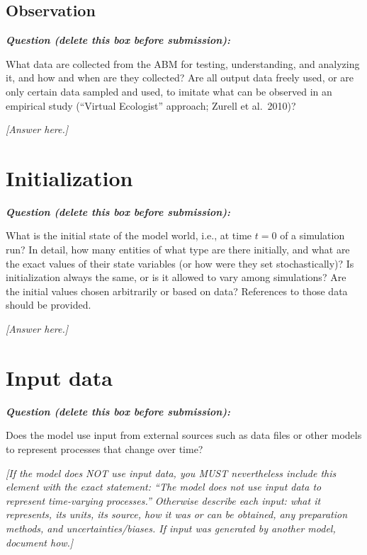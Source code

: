 \documentclass[11pt,a4paper]{article}
\newenvironment{question}
  {\begin{oddquestion}\small\itshape\color{oddquestioncolor}%
   \textbf{Question (delete this box before submission):}\par\smallskip}
  {\end{oddquestion}}
\begin{document}
\subsection{Observation}
\begin{question}
What data are collected from the ABM for testing, understanding, and
analyzing it, and how and when are they collected? Are all output data
freely used, or are only certain data sampled and used, to imitate what
can be observed in an empirical study (``Virtual Ecologist'' approach;
Zurell et al.\ 2010)?
\end{question}
\textit{[Answer here.]}


\section{Initialization}
\begin{question}
What is the initial state of the model world, i.e., at time $t = 0$ of
a simulation run? In detail, how many entities of what type are there
initially, and what are the exact values of their state variables (or
how were they set stochastically)? Is initialization always the same, or
is it allowed to vary among simulations? Are the initial values chosen
arbitrarily or based on data? References to those data should be
provided.
\end{question}
\textit{[Answer here.]}%


\section{Input data}
\begin{question}
Does the model use input from external sources such as data files or
other models to represent processes that change over time?
\end{question}
\textit{[If the model does NOT use input data, you MUST nevertheless
include this element with the exact statement: ``The model does not use
input data to represent time-varying processes.'' Otherwise describe
each input: what it represents, its units, its source, how it was or can
be obtained, any preparation methods, and uncertainties/biases. If input
was generated by another model, document how.]}
\end{document}
